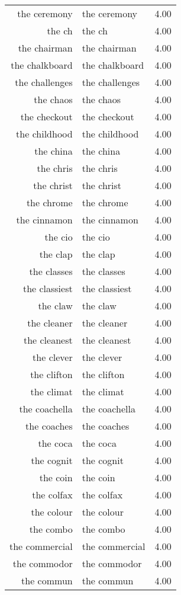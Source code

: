 \begin{table}[ht]
\begin{tabular}{rlr}
  the ceremony & the ceremony & 4.00 \\ 
  the ch & the ch & 4.00 \\ 
  the chairman & the chairman & 4.00 \\ 
  the chalkboard & the chalkboard & 4.00 \\ 
  the challenges & the challenges & 4.00 \\ 
  the chaos & the chaos & 4.00 \\ 
  the checkout & the checkout & 4.00 \\ 
  the childhood & the childhood & 4.00 \\ 
  the china & the china & 4.00 \\ 
  the chris & the chris & 4.00 \\ 
  the christ & the christ & 4.00 \\ 
  the chrome & the chrome & 4.00 \\ 
  the cinnamon & the cinnamon & 4.00 \\ 
  the cio & the cio & 4.00 \\ 
  the clap & the clap & 4.00 \\ 
  the classes & the classes & 4.00 \\ 
  the classiest & the classiest & 4.00 \\ 
  the claw & the claw & 4.00 \\ 
  the cleaner & the cleaner & 4.00 \\ 
  the cleanest & the cleanest & 4.00 \\ 
  the clever & the clever & 4.00 \\ 
  the clifton & the clifton & 4.00 \\ 
  the climat & the climat & 4.00 \\ 
  the coachella & the coachella & 4.00 \\ 
  the coaches & the coaches & 4.00 \\ 
  the coca & the coca & 4.00 \\ 
  the cognit & the cognit & 4.00 \\ 
  the coin & the coin & 4.00 \\ 
  the colfax & the colfax & 4.00 \\ 
  the colour & the colour & 4.00 \\ 
  the combo & the combo & 4.00 \\ 
  the commercial & the commercial & 4.00 \\ 
  the commodor & the commodor & 4.00 \\ 
  the commun & the commun & 4.00 \\ 

\end{tabular}
\end{table}
